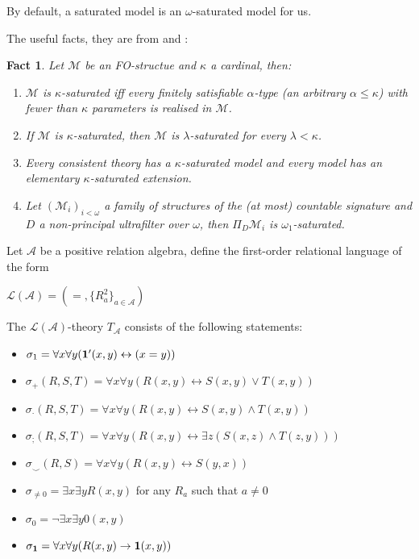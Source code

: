 \documentclass[a4paper]{article}
\theoremstyle{defin}
\theoremstyle{theorem}
\theoremstyle{claim}
\theoremstyle{prop}
\theoremstyle{lemma}
\theoremstyle{fact}
\newtheorem{fact}{Fact}
\theoremstyle{ex}
\theoremstyle{col}
\begin{document}
By default, a saturated model is an $\omega$-saturated model for us.

The useful facts, they are from \cite{chang1990model} and \cite{hodges1993model}:

\begin{fact} Let $\mathcal{M}$ be an FO-structue and $\kappa$ a cardinal, then:
\begin{enumerate}
\item $\mathcal{M}$ is $\kappa$-saturated iff every finitely satisfiable $\alpha$-type (an arbitrary $\alpha \leq \kappa$) with fewer than $\kappa$ parameters is realised in  $\mathcal{M}$.
\item If $\mathcal{M}$ is $\kappa$-saturated, then $\mathcal{M}$ is $\lambda$-saturated for every $\lambda < \kappa$.
\item \label{saturation} Every consistent theory has a $\kappa$-saturated model and every model has an elementary $\kappa$-saturated extension.
\item Let $(\mathcal{M}_i)_{i < \omega}$ a family of structures of the (at most) countable signature and $D$ a non-principal ultrafilter over $\omega$, then $\Pi_D \mathcal{M}_i$ is $\omega_1$-saturated.
\end{enumerate}
\end{fact}

Let $\mathcal{A}$ be a positive relation algebra, define the first-order relational language of the form
\begin{center}
$\mathcal{L}(\mathcal{A}) = (=, \{ R^2_a \}_{a \in \mathcal{A}})$
\end{center}

The $\mathcal{L}(\mathcal{A})$-theory ${T}_{\mathcal{A}}$ consists of the following statements:
\begin{itemize}
\item $\sigma_1 = \forall x \forall y ({\bf 1}'(x, y) \leftrightarrow (x = y))$
\item $\sigma_+(R, S, T) = \forall x \forall y (R(x, y) \leftrightarrow S(x, y) \lor T (x, y))$
\item $\sigma_{\cdot}(R, S, T) = \forall x \forall y (R(x, y) \leftrightarrow S(x, y) \land T (x, y))$
\item $\sigma_{;}(R, S, T) = \forall x \forall y (R(x, y) \leftrightarrow \exists z (S(x, z) \land T(z, y)))$
\item $\sigma_{\smile}(R, S) = \forall x \forall y (R(x, y) \leftrightarrow S(y, x))$
\item $\sigma_{\neq 0} = \exists x \exists y R(x, y)$ for any $R_a$ such that $a \neq 0$
\item $\sigma_{0} = \neg \exists x \exists y 0(x, y)$
\item $\sigma_{{\bf 1}} = \forall x \forall y (R(x, y) \rightarrow {\bf 1}(x, y))$
\end{itemize}
\end{document}

